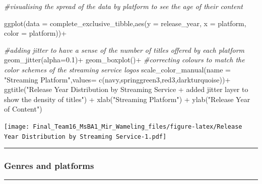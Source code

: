 \documentclass[
]{article}
\newenvironment{Shaded}{\begin{snugshade}}{\end{snugshade}}
\newcommand{\AttributeTok}[1]{\textcolor[rgb]{0.77,0.63,0.00}{#1}}
\newcommand{\CommentTok}[1]{\textcolor[rgb]{0.56,0.35,0.01}{\textit{#1}}}
\newcommand{\FloatTok}[1]{\textcolor[rgb]{0.00,0.00,0.81}{#1}}
\newcommand{\FunctionTok}[1]{\textcolor[rgb]{0.00,0.00,0.00}{#1}}
\newcommand{\NormalTok}[1]{#1}
\newcommand{\SpecialCharTok}[1]{\textcolor[rgb]{0.00,0.00,0.00}{#1}}
\newcommand{\StringTok}[1]{\textcolor[rgb]{0.31,0.60,0.02}{#1}}
\begin{document}
\begin{Shaded}
\begin{Highlighting}[]
\CommentTok{\#visualising the spread of the data by platform to see the age of their content}

\FunctionTok{ggplot}\NormalTok{(}\AttributeTok{data =}\NormalTok{ complete\_exclusive\_tibble,}\FunctionTok{aes}\NormalTok{(}\AttributeTok{y =}\NormalTok{ release\_year, }\AttributeTok{x =}\NormalTok{ platform, }\AttributeTok{color =}\NormalTok{ platform))}\SpecialCharTok{+}
  
  \CommentTok{\#adding jitter to have a sense of the number of titles offered by each platform}
  \FunctionTok{geom\_jitter}\NormalTok{(}\AttributeTok{alpha=}\FloatTok{0.1}\NormalTok{)}\SpecialCharTok{+}
  \FunctionTok{geom\_boxplot}\NormalTok{()}\SpecialCharTok{+}
  \CommentTok{\#correcting colours to match the color schemes of the streaming service logos}
  \FunctionTok{scale\_color\_manual}\NormalTok{(}\AttributeTok{name =} \StringTok{"Streaming Platform"}\NormalTok{,}\AttributeTok{values=} \FunctionTok{c}\NormalTok{(}\StringTok{\textquotesingle{}navy\textquotesingle{}}\NormalTok{,}\StringTok{\textquotesingle{}springgreen3\textquotesingle{}}\NormalTok{,}\StringTok{\textquotesingle{}red3\textquotesingle{}}\NormalTok{,}\StringTok{\textquotesingle{}darkturquoise\textquotesingle{}}\NormalTok{))}\SpecialCharTok{+}
  \FunctionTok{ggtitle}\NormalTok{(}\StringTok{"Release Year Distribution by Streaming Service}
\StringTok{+ added jitter layer to show the density of titles"}\NormalTok{) }\SpecialCharTok{+}
  \FunctionTok{xlab}\NormalTok{(}\StringTok{"Streaming Platform"}\NormalTok{) }\SpecialCharTok{+} \FunctionTok{ylab}\NormalTok{(}\StringTok{"Release Year of Content"}\NormalTok{)}
\end{Highlighting}
\end{Shaded}

\texttt{[image: Final\_Team16\_MsBA1\_Mir\_Wameling\_files/figure-latex/Release Year Distribution by Streaming Service-1.pdf]}

\begin{center}\rule{0.5\linewidth}{0.5pt}\end{center}

\hypertarget{genres-and-platforms}{%
\subsubsection{Genres and platforms}\label{genres-and-platforms}}

\begin{center}\rule{0.5\linewidth}{0.5pt}\end{center}
\end{document}
